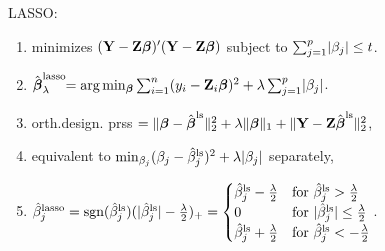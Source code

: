 LASSO: \begin{enumerate}[leftmargin = 2em]
    \item minimizes $(\mathbf{Y} - \mathbf{Z} \boldsymbol{\beta})'(\mathbf{Y} - \mathbf{Z} \boldsymbol{\beta})$ subject to $\sum_{j=1}^p \lvert \beta_j \rvert \leq t$.
    \item \vspace{-1ex} $\hat{\boldsymbol{\beta}}^{\text{lasso}}_\lambda \!\!= \arg \min_{\boldsymbol{\beta}} \sum_{i=1}^n (y_i - \mathbf{Z}_i \boldsymbol{\beta})^2 + \lambda \sum_{j=1}^p \lvert \beta_j \rvert$.
    \item orth.design. prss $= \lVert \boldsymbol{\beta} - \hat{\boldsymbol{\beta}}^{\text{ls}} \rVert_2^2 + \lambda \lVert \boldsymbol{\beta} \rVert_1 + \lVert \mathbf{Y} - \mathbf{Z} \hat{\boldsymbol{\beta}}^{\text{ls}} \rVert_2^2$,
    \item [] equivalent to $\min_{\beta_j} (\beta_j - \hat{{\beta}}^{\text{ls}}_j)^2 + \lambda \lvert \beta_j \rvert$ separately,
    \item [] $\hat{{\beta}}^{\text{lasso}}_j = \text{sgn}(\hat{{\beta}}^{\text{ls}}_j) (\lvert \hat{{\beta}}^{\text{ls}}_j \rvert - \frac{\lambda}{2})_+ = 
        \begin{cases}
            \hat{{\beta}}^{\text{ls}}_j - \frac{\lambda}{2} & \text{for } \hat{{\beta}}^{\text{ls}}_j > \frac{\lambda}{2} \\
            0 & \text{for } \lvert \hat{{\beta}}^{\text{ls}}_j \rvert \leq \frac{\lambda}{2} \\
            \hat{{\beta}}^{\text{ls}}_j + \frac{\lambda}{2} & \text{for } \hat{{\beta}}^{\text{ls}}_j < -\frac{\lambda}{2} \\
        \end{cases}$.
\end{enumerate}





